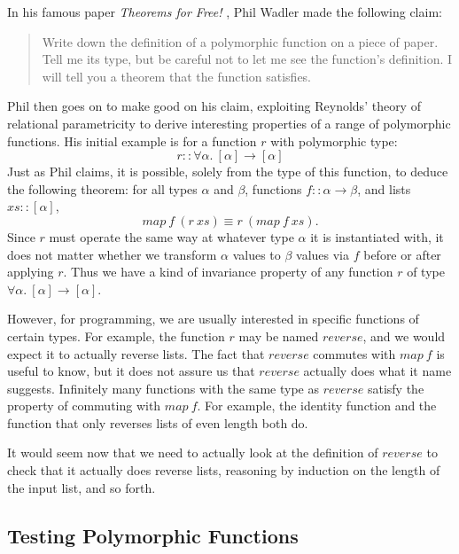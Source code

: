 \documentclass{llncs}
\begin{document}
In his famous paper \emph{Theorems for Free!}
\cite{DBLP:conf/fpca/Wadler89}, Phil Wadler made the following claim:
\begin{quotation}
  \noindent
  Write down the definition of a polymorphic function on a piece of
  paper. Tell me its type, but be careful not to let me see the
  function's definition. I will tell you a theorem that the function
  satisfies.
\end{quotation}
Phil then goes on to make good on his claim, exploiting Reynolds'
theory of relational parametricity \cite{DBLP:conf/ifip/Reynolds83} to
derive interesting properties of a range of polymorphic functions. His
initial example is for a function $r$ with polymorphic type:
\begin{displaymath}
  \mathit{r} :: \forall \alpha.~[\alpha] \to [\alpha]
\end{displaymath}
Just as Phil claims, it is possible, solely from the type of this
function, to deduce the following theorem: for all types $\alpha$ and
$\beta$, functions $f :: \alpha \to \beta$, and lists
$\mathit{xs} :: [\alpha]$,
\begin{displaymath}
  \mathit{map}~f~(\mathit{r}~\mathit{xs}) \equiv \mathit{r}~(\mathit{map}~f~\mathit{xs}).
\end{displaymath}
Since $\mathit{r}$ must operate the same way at whatever type $\alpha$
it is instantiated with, it does not matter whether we transform
$\alpha$ values to $\beta$ values via $f$ before or after applying
$\mathit{r}$. Thus we have a kind of invariance property of any
function $r$ of type $\forall \alpha.~[\alpha] \to [\alpha]$.

However, for programming, we are usually interested in specific
functions of certain types. For example, the function $r$ may be named
$\mathit{reverse}$, and we would expect it to actually reverse
lists. The fact that $\mathit{reverse}$ commutes with $\mathit{map}~f$
is useful to know, but it does not assure us that $\mathit{reverse}$
actually does what it name suggests. Infinitely many functions with
the same type as $\mathit{reverse}$ satisfy the property of commuting
with $\mathit{map}~f$. For example, the identity function and the
function that only reverses lists of even length both do.

It would seem now that we need to actually look at the definition of
$\mathit{reverse}$ to check that it actually does reverse lists,
reasoning by induction on the length of the input list, and so forth.

\subsection{Testing Polymorphic Functions}
\end{document}
